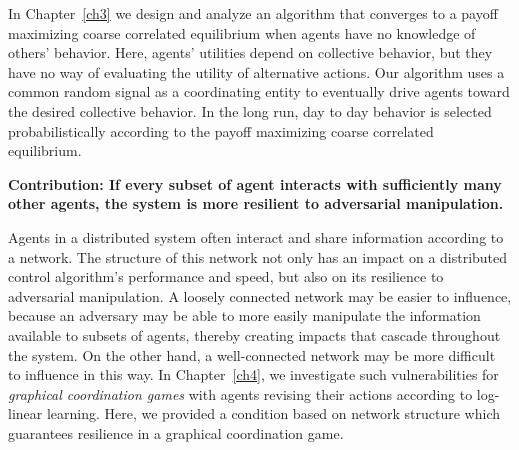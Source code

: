 In Chapter~\ref{ch3} we design and analyze an algorithm that converges to a payoff maximizing coarse correlated equilibrium when agents have no knowledge of others' behavior. Here, agents' utilities depend on collective behavior, but they have no way of evaluating the utility of alternative actions. Our algorithm uses a common random signal as a coordinating entity to eventually drive agents toward the desired collective behavior. In the long run, day to day behavior is selected probabilistically according to the payoff maximizing coarse correlated equilibrium.

 


\smallskip

 \noindent\textbf{Contribution: If every subset of agent interacts with sufficiently many other agents, the system is more resilient to adversarial manipulation.}


Agents in a distributed system often interact and share information according to a network. The structure of this network not only has an impact on a distributed control algorithm's performance and speed, but also on its resilience to adversarial manipulation. A loosely connected network may be easier to influence, because an adversary may be able to more easily manipulate the information available to subsets of agents, thereby creating impacts that cascade throughout the system. On the other hand, a well-connected network may be more difficult to influence in this way. In Chapter~\ref{ch4}, we investigate such vulnerabilities for  {\it graphical coordination games} \cite{Ullmann1977,Cooper1999} with agents revising their actions according to log-linear learning. Here, we provided a condition based on network structure which guarantees resilience in a graphical coordination game. 


